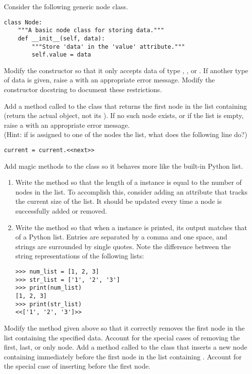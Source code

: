 Consider the following generic node class.
\begin{lstlisting}
class Node:
    """A basic node class for storing data."""
    def __init__(self, data):
        """Store 'data' in the 'value' attribute."""
        self.value = data
\end{lstlisting}

Modify the constructor so that it only accepts data of type , , or .
If another type of data is given, raise a  with an appropriate error message.
Modify the constructor docstring to document these restrictions.

Add a method called  to the  class that
returns the first node in the list containing  (return the actual  object, not its ).
If no such node exists, or if the list is empty, raise a  with an appropriate error message.
\\
(Hint: if  is assigned to one of the nodes the list, what does the following line do?)
\begin{lstlisting}
current = current.<<next>>
\end{lstlisting}
Add magic methods to the  class so it behaves more like the built-in Python list.
\begin{enumerate}
\item Write the  method so that the length of a  instance is equal to the number of nodes in the list.
To accomplish this, consider adding an attribute that tracks the current size of the list.
It should be updated every time a node is successfully added or removed.

\item Write the  method so that when a  instance is printed, its output matches that of a Python list.
Entries are separated by a comma and one space, and strings are surrounded by single quotes.
Note the difference between the string representations of the following lists:

\begin{lstlisting}
>>> num_list = [1, 2, 3]
>>> str_list = ['1', '2', '3']
>>> print(num_list)
[1, 2, 3]
>>> print(str_list)
<<['1', '2', '3']>>
\end{lstlisting}
\end{enumerate}
Modify the  method given above so that it correctly removes the first node in the list containing the specified data.
Account for the special cases of removing the first, last, or only node.
Add a method called  to the  class that inserts a new node containing  immediately before the first node in the list containing .
Account for the special case of inserting before the first node.

